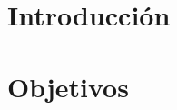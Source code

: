 \documentclass[11pt,twoside,titlepage]{report}
\begin{document}
\lstlistoflistings
\afterpage{\blankpage}









\pagestyle{fancy}


\renewcommand{\chaptermark}[1]{\markboth{Capítulo \thechapter.\ #1}{}}

\pagestyle{fancy}
\fancyhf{}
\fancyhead[LO]{\leftmark}
\fancyhead[RO]{}
\fancyhead[RE]{\nouppercase\rightmark}
\fancyhead[LE]{}
\fancyfoot[C]{\thepage}










\chapter{Introducción}



\pagestyle{fancy}


\setlength{\parskip}{0.75em}
\renewcommand{\baselinestretch}{1.25}
\setcounter{page}{1}






\chapter{Objetivos}
\label{chap:objetivos}
\end{document}

